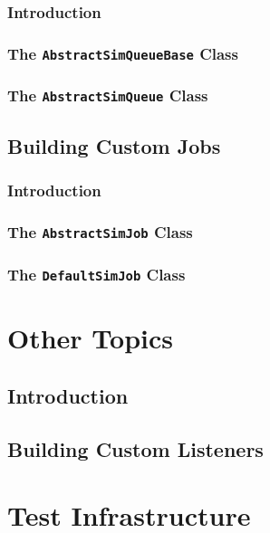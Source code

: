 \documentclass[12pt]{book}
\begin{document}
\subsection{Introduction}

\subsection{The \lstinline{AbstractSimQueueBase} Class}

\subsection{The \lstinline{AbstractSimQueue} Class}

\section{Building Custom Jobs}

\subsection{Introduction}

\subsection{The \lstinline{AbstractSimJob} Class}

\subsection{The \lstinline{DefaultSimJob} Class}

\chapter{Other Topics}

\section{Introduction}

\section{Building Custom Listeners}

\chapter{Test Infrastructure}
\end{document}
